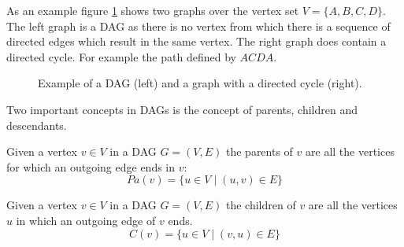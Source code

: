 \noindent
As an example figure \ref{fig:example_DAG} shows two graphs 
over the vertex set $V=\{A, B, C, D\}$. The left graph is a DAG
as there is no vertex from which there is a sequence of directed
edges which result in the same vertex. The right graph does 
contain a directed cycle. For example the path defined by $ACDA$.

\begin{figure}[h!]
\centering

\begin{minipage}[c]{0.3\textwidth}
\end{minipage}
\begin{minipage}[c]{0.3\textwidth}
\end{minipage}
\caption{Example of a DAG (left) and a graph with a directed
cycle (right).}
\label{fig:example_DAG}
\end{figure}

\noindent
Two important concepts in DAGs is the concept of parents, children 
and descendants.
\begin{defn}[Parents]
Given a vertex $v \in V$ in a DAG $G=(V, E)$ the parents of 
$v$ are all the vertices for which an outgoing edge ends in $v$:
\begin{equation}
Pa(v) = \{ u \in V \mid (u, v) \in E\}
\end{equation}
\end{defn}

\begin{defn}[Children]
Given a vertex $v \in V$ in a DAG $G=(V, E)$ the children of 
$v$ are all the vertices $u$ in which an outgoing edge of $v$
ends.
\begin{equation}
C(v) = \{ u \in V \mid (v, u) \in E\}
\end{equation}
\end{defn}

